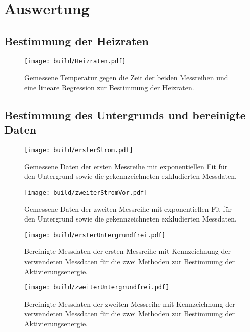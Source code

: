 \section{Auswertung}
\label{sec:Auswertung}

\subsection{Bestimmung der Heizraten}
\begin{figure}
  \centering
  \texttt{[image: build/Heizraten.pdf]}
  \caption{Gemessene Temperatur gegen die Zeit der beiden Messreihen und eine lineare Regression zur Bestimmung der Heizraten.}
  \label{fig:Heizraten}
\end{figure}
\FloatBarrier
\subsection{Bestimmung des Untergrunds und bereinigte Daten}
\begin{figure}
    \centering
    \texttt{[image: build/ersterStrom.pdf]}
    \caption{Gemessene Daten der ersten Messreihe mit exponentiellen Fit für den Untergrund sowie die gekennzeichneten exkludierten Messdaten.}
    \label{fig:Untergrund1}
\end{figure}

\begin{figure}
    \centering
    \texttt{[image: build/zweiterStromVor.pdf]}
    \caption{Gemessene Daten der zweiten Messreihe mit exponentiellen Fit für den Untergrund sowie die gekennzeichneten exkludierten Messdaten.}
    \label{fig:Untergrund2}
\end{figure}

\begin{figure}
    \centering
    \texttt{[image: build/ersterUntergrundfrei.pdf]}
    \caption{Bereinigte Messdaten der ersten Messreihe mit Kennzeichnung der verwendeten Messdaten für die zwei Methoden zur Bestimmung der Aktivierungsenergie.}
    \label{fig:Untergrundfrei1}
\end{figure}

\begin{figure}
    \centering
    \texttt{[image: build/zweiterUntergrundfrei.pdf]}
    \caption{Bereinigte Messdaten der zweiten Messreihe mit Kennzeichnung der verwendeten Messdaten für die zwei Methoden zur Bestimmung der Aktivierungsenergie.}
    \label{fig:Untergrundfrei2}
\end{figure}

